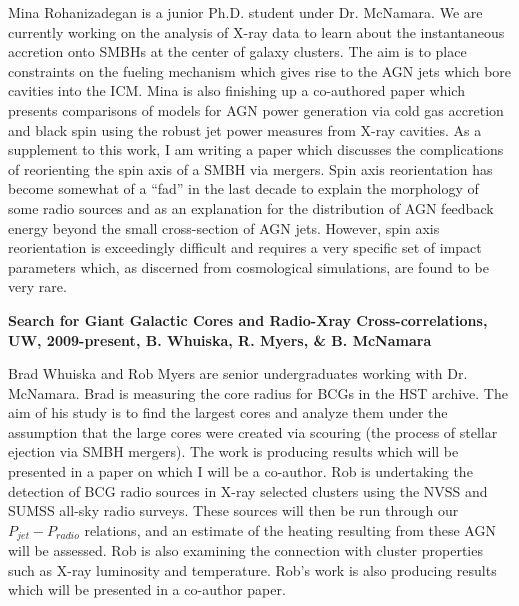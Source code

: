 \documentclass[12pt]{cv}
\begin{document}
Mina Rohanizadegan is a junior Ph.D. student under Dr. McNamara. We
are currently working on the analysis of X-ray data to learn about the
instantaneous accretion onto SMBHs at the center of galaxy
clusters. The aim is to place constraints on the fueling mechanism
which gives rise to the AGN jets which bore cavities into the
ICM. Mina is also finishing up a co-authored paper which presents
comparisons of models for AGN power generation via cold gas accretion
and black spin using the robust jet power measures from X-ray
cavities. As a supplement to this work, I am writing a paper which
discusses the complications of reorienting the spin axis of a SMBH via
mergers. Spin axis reorientation has become somewhat of a ``fad'' in
the last decade to explain the morphology of some radio sources and as
an explanation for the distribution of AGN feedback energy beyond the
small cross-section of AGN jets. However, spin axis reorientation is
exceedingly difficult and requires a very specific set of impact
parameters which, as discerned from cosmological simulations, are
found to be very rare.

{\bfseries{Search for Giant Galactic Cores and Radio-Xray Cross-correlations, UW, 2009-present, B. Whuiska, R. Myers, \& B. McNamara}}

Brad Whuiska and Rob Myers are senior undergraduates working with
Dr. McNamara. Brad is measuring the core radius for BCGs in the HST
archive. The aim of his study is to find the largest cores and analyze
them under the assumption that the large cores were created via
scouring (the process of stellar ejection via SMBH mergers). The work
is producing results which will be presented in a paper on which I
will be a co-author. Rob is undertaking the detection of BCG radio
sources in X-ray selected clusters using the NVSS and SUMSS all-sky
radio surveys. These sources will then be run through our
$P_{jet}-P_{radio}$ relations, and an estimate of the heating
resulting from these AGN will be assessed. Rob is also examining the
connection with cluster properties such as X-ray luminosity and
temperature. Rob's work is also producing results which will be
presented in a co-author paper.



\end{document}

